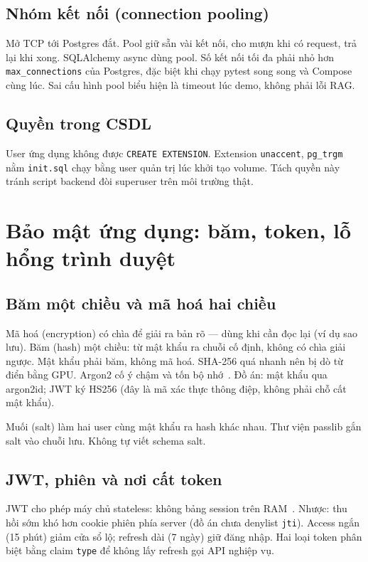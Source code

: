 \subsection{Nhóm kết nối (connection pooling)}

Mở TCP tới Postgres đắt. Pool giữ sẵn vài kết nối, cho mượn khi có request, trả
lại khi xong. SQLAlchemy async dùng pool. Số kết nối tối đa phải nhỏ hơn
\texttt{max\_connections} của Postgres, đặc biệt khi chạy pytest song song và
Compose cùng lúc. Sai cấu hình pool biểu hiện là timeout lúc demo, không phải
lỗi RAG.

\subsection{Quyền trong CSDL}

User ứng dụng không được \texttt{CREATE EXTENSION}. Extension
\texttt{unaccent}, \texttt{pg\_trgm} nằm \texttt{init.sql} chạy bằng user quản
trị lúc khởi tạo volume. Tách quyền này tránh script backend đòi superuser trên
môi trường thật.

\section{Bảo mật ứng dụng: băm, token, lỗ hổng trình duyệt}

\subsection{Băm một chiều và mã hoá hai chiều}

Mã hoá (encryption) có chìa để giải ra bản rõ --- dùng khi cần đọc lại (ví dụ
sao lưu). Băm (hash) một chiều: từ mật khẩu ra chuỗi cố định, không có chìa giải
ngược. Mật khẩu phải băm, không mã hoá. SHA-256 quá nhanh nên bị dò từ điển bằng
GPU. Argon2 cố ý chậm và tốn bộ nhớ~\cite{argon2}. Đồ án: mật khẩu qua argon2id;
JWT ký HS256 (đây là mã xác thực thông điệp, không phải chỗ cất mật khẩu).

Muối (salt) làm hai user cùng mật khẩu ra hash khác nhau. Thư viện passlib gắn
salt vào chuỗi lưu. Không tự viết schema salt.

\subsection{JWT, phiên và nơi cất token}

JWT cho phép máy chủ stateless: không bảng session trên RAM~\cite{rfc7519}.
Nhược: thu hồi sớm khó hơn cookie phiên phía server (đồ án chưa denylist
\texttt{jti}). Access ngắn (15 phút) giảm cửa sổ lộ; refresh dài (7 ngày) giữ
đăng nhập. Hai loại token phân biệt bằng claim \texttt{type} để không lấy
refresh gọi API nghiệp vụ.

